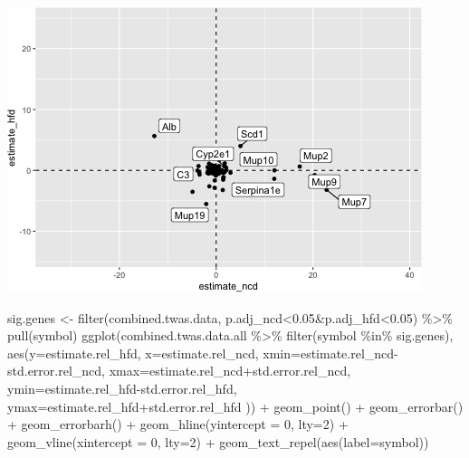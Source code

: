 \documentclass[
]{article}
\newenvironment{Shaded}{\begin{snugshade}}{\end{snugshade}}
\newcommand{\AttributeTok}[1]{\textcolor[rgb]{0.77,0.63,0.00}{#1}}
\newcommand{\DecValTok}[1]{\textcolor[rgb]{0.00,0.00,0.81}{#1}}
\newcommand{\FloatTok}[1]{\textcolor[rgb]{0.00,0.00,0.81}{#1}}
\newcommand{\FunctionTok}[1]{\textcolor[rgb]{0.00,0.00,0.00}{#1}}
\newcommand{\NormalTok}[1]{#1}
\newcommand{\OtherTok}[1]{\textcolor[rgb]{0.56,0.35,0.01}{#1}}
\newcommand{\SpecialCharTok}[1]{\textcolor[rgb]{0.00,0.00,0.00}{#1}}
\begin{document}
\includegraphics{figures/twas-chol-integrated-1.png}

\begin{Shaded}
\begin{Highlighting}[]
\NormalTok{sig.genes }\OtherTok{\textless{}{-}} \FunctionTok{filter}\NormalTok{(combined.twas.data, p.adj\_ncd}\SpecialCharTok{\textless{}}\FloatTok{0.05}\SpecialCharTok{\&}\NormalTok{p.adj\_hfd}\SpecialCharTok{\textless{}}\FloatTok{0.05}\NormalTok{) }\SpecialCharTok{\%\textgreater{}\%} \FunctionTok{pull}\NormalTok{(symbol)}
\FunctionTok{ggplot}\NormalTok{(combined.twas.data.all }\SpecialCharTok{\%\textgreater{}\%} \FunctionTok{filter}\NormalTok{(symbol }\SpecialCharTok{\%in\%}\NormalTok{ sig.genes), }
       \FunctionTok{aes}\NormalTok{(}\AttributeTok{y=}\NormalTok{estimate.rel\_hfd, }\AttributeTok{x=}\NormalTok{estimate.rel\_ncd,}
           \AttributeTok{xmin=}\NormalTok{estimate.rel\_ncd}\SpecialCharTok{{-}}\NormalTok{std.error.rel\_ncd,}
           \AttributeTok{xmax=}\NormalTok{estimate.rel\_ncd}\SpecialCharTok{+}\NormalTok{std.error.rel\_ncd,}
           \AttributeTok{ymin=}\NormalTok{estimate.rel\_hfd}\SpecialCharTok{{-}}\NormalTok{std.error.rel\_hfd,}
           \AttributeTok{ymax=}\NormalTok{estimate.rel\_hfd}\SpecialCharTok{+}\NormalTok{std.error.rel\_hfd )) }\SpecialCharTok{+}
  \FunctionTok{geom\_point}\NormalTok{() }\SpecialCharTok{+}
  \FunctionTok{geom\_errorbar}\NormalTok{() }\SpecialCharTok{+}
  \FunctionTok{geom\_errorbarh}\NormalTok{() }\SpecialCharTok{+}
  \FunctionTok{geom\_hline}\NormalTok{(}\AttributeTok{yintercept =} \DecValTok{0}\NormalTok{, }\AttributeTok{lty=}\DecValTok{2}\NormalTok{) }\SpecialCharTok{+}
  \FunctionTok{geom\_vline}\NormalTok{(}\AttributeTok{xintercept =} \DecValTok{0}\NormalTok{, }\AttributeTok{lty=}\DecValTok{2}\NormalTok{) }\SpecialCharTok{+}
  \FunctionTok{geom\_text\_repel}\NormalTok{(}\FunctionTok{aes}\NormalTok{(}\AttributeTok{label=}\NormalTok{symbol))}
\end{Highlighting}
\end{Shaded}
\end{document}
